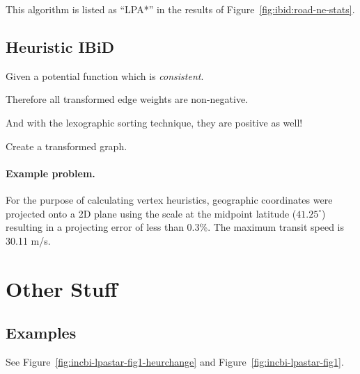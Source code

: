 This algorithm is listed as ``LPA*''
in the results of Figure~\ref{fig:ibid:road-ne-stats}.

\subsection{Heuristic IBiD}

Given a potential function which is \emph{consistent}.

Therefore all transformed edge weights are non-negative.

And with the lexographic sorting technique,
they are positive as well!

Create a transformed graph.

\paragraph{Example problem.}

For the purpose of calculating vertex heuristics,
geographic coordinates were projected onto a 2D plane using the
scale at the midpoint latitude ($41.25^\circ$)
resulting in a projecting error of less than 0.3\%.
The maximum transit speed is 30.11 m/s.

\section{Other Stuff}

\subsection{Examples}

See Figure~\ref{fig:incbi-lpastar-fig1-heurchange}
and Figure~\ref{fig:incbi-lpastar-fig1}.


